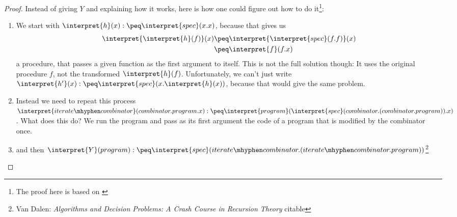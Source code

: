 \begin{proof}
	\TODO {}

	Instead of giving $Y$ and explaining how it works, here is how one could 
	figure out how to do it\footnote{The proof here is based on \cite{dalenrecursion}}:

	\begin{enumerate}
		\item We start with $\interpret{h}(x):\peq \interpret{spec}(x.x)$, 
			because that gives us 
			\begin{equation*}
				\begin{split}
					\interpret{\interpret{h}(f)}(x)
					&\peq \interpret{\interpret{spec}(f.f)}(x)\\
					&\peq \interpret{f}(f.x)
				\end{split}
			\end{equation*}
			a procedure, that passes a given function as the first argument to 
			itself. This is not the full solution though: It uses the original 
			procedure $f$, not the transformed $\interpret{h}(f)$. Unfortunately, 
			we can't just write 
			$\interpret{h'}(x):\peq \interpret{spec}(x.\interpret{h}(x))$, because 
			that would give the same problem. 
		\item Instead we need to repeat this process 
			$\interpret{iterate\mhyphen combinator}(combinator.program.x):\peq 
			\interpret{program}(\interpret{spec}(combinator.(combinator.program)).x)$. 
			What does this do? We run the program and pass as its first argument 
			the code of a program that is modified by the combinator once. 
		\item
			and then $\interpret{Y}(program):\peq \interpret{spec}(iterate\mhyphen combinator.(iterate\mhyphen combinator.program))$\footnote{Van 
				Dalen: {\em Algorithms and Decision Problems: A Crash Course in 
				Recursion Theory} \TODO citable}
	\end{enumerate}
\end{proof}

